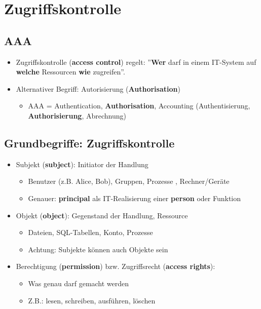 \documentclass[openany]{book}
\begin{document}
\chapter{Zugriffskontrolle}

\section{AAA}

\begin{itemize}
\item Zugriffskontrolle (\textbf{access control}) regelt: ''\textbf{Wer} darf in einem IT-System auf \textbf{welche} Ressourcen \textbf{wie} zugreifen''.
\item Alternativer Begriff: Autorisierung (\textbf{Authorisation})
\begin{itemize}
\item AAA = Authentication, \textbf{Authorisation}, Accounting (Authentisierung, \textbf{Authorisierung}, Abrechnung)
\end{itemize}
\end{itemize}

\section{Grundbegriffe: Zugriffskontrolle}

\begin{itemize}
\item Subjekt (\textbf{subject}): Initiator der Handlung
\begin{itemize}
\item Benutzer (z.B. Alice, Bob), Gruppen, Prozesse , Rechner/Geräte
\item Genauer: \textbf{principal} als IT-Realisierung einer \textbf{person} oder Funktion
\end{itemize}
\item Objekt (\textbf{object}): Gegenstand der Handlung, Ressource
\begin{itemize}
\item Dateien, SQL-Tabellen, Konto, Prozesse
\item Achtung: Subjekte können auch Objekte sein
\end{itemize}
\item Berechtigung (\textbf{permission}) bzw. Zugriffsrecht (\textbf{access rights}):
\begin{itemize}
\item Was genau darf gemacht werden
\item Z.B.: lesen, schreiben, ausführen, löschen
\end{itemize}
\end{itemize}
\end{document}
